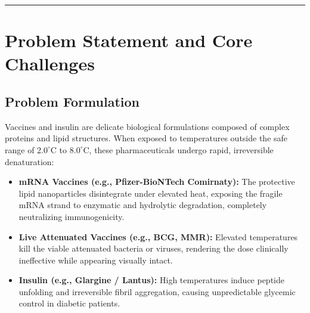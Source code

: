 \documentclass[11pt,a4paper]{article}
\begin{document}
\vspace{0.8em}
\noindent\rule{\textwidth}{0.5pt}
\vspace{1.2em}

\section{Problem Statement and Core Challenges}

\subsection{Problem Formulation}
Vaccines and insulin are delicate biological formulations composed of complex proteins and lipid structures. When exposed to temperatures outside the safe range of $2.0^\circ\text{C}$ to $8.0^\circ\text{C}$, these pharmaceuticals undergo rapid, irreversible denaturation:
\begin{itemize}[leftmargin=2em,itemsep=2pt]
    \item \textbf{mRNA Vaccines (e.g., Pfizer-BioNTech Comirnaty):} The protective lipid nanoparticles disintegrate under elevated heat, exposing the fragile mRNA strand to enzymatic and hydrolytic degradation, completely neutralizing immunogenicity.
    \item \textbf{Live Attenuated Vaccines (e.g., BCG, MMR):} Elevated temperatures kill the viable attenuated bacteria or viruses, rendering the dose clinically ineffective while appearing visually intact.
    \item \textbf{Insulin (e.g., Glargine / Lantus):} High temperatures induce peptide unfolding and irreversible fibril aggregation, causing unpredictable glycemic control in diabetic patients.
\end{itemize}
\end{document}

